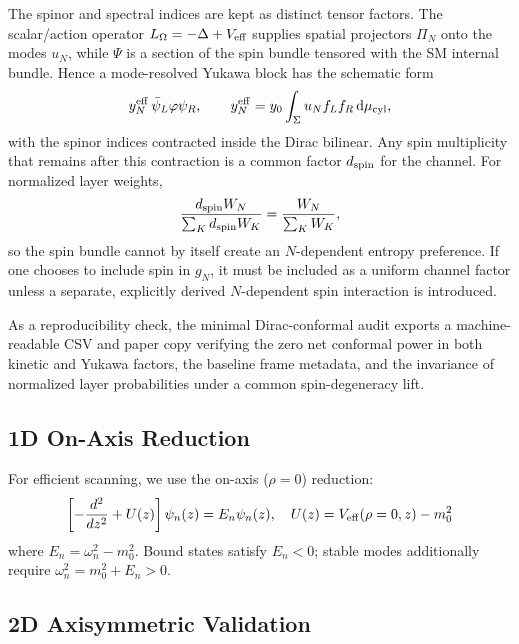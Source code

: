 \documentclass[aps,prd,onecolumn,notitlepage,nofootinbib,superscriptaddress,11pt,floatfix]{revtex4-2}
\newcommand{\dd}{\mathrm{d}}
\begin{document}
The spinor and spectral indices are kept as distinct tensor factors.  The scalar/action operator \(L_\Omega=-\Delta+V_{\rm eff}\) supplies spatial projectors \(\Pi_N\) onto the modes \(u_N\), while \(\Psi\) is a section of the spin bundle tensored with the SM internal bundle.  Hence a mode-resolved Yukawa block has the schematic form
\begin{equation}
y_N^{\rm eff}\,\bar\psi_L\varphi\psi_R,\qquad
y_N^{\rm eff}=y_0\int_\Sigma u_N f_L f_R\,\dd\mu_{\rm cyl},
\end{equation}
with the spinor indices contracted inside the Dirac bilinear.  Any spin multiplicity that remains after this contraction is a common factor \(d_{\rm spin}\) for the channel.  For normalized layer weights,
\begin{equation}
\frac{d_{\rm spin}W_N}{\sum_K d_{\rm spin}W_K}
=
\frac{W_N}{\sum_K W_K},
\end{equation}
so the spin bundle cannot by itself create an \(N\)-dependent entropy preference.  If one chooses to include spin in \(g_N\), it must be included as a uniform channel factor unless a separate, explicitly derived \(N\)-dependent spin interaction is introduced.

As a reproducibility check, the minimal Dirac-conformal audit exports a machine-readable CSV and paper copy verifying the zero net conformal power in both kinetic and Yukawa factors, the baseline frame metadata, and the invariance of normalized layer probabilities under a common spin-degeneracy lift.

\subsection{1D On-Axis Reduction}
\label{app:1D}

For efficient scanning, we use the on-axis ($\rho = 0$) reduction:
\begin{equation}
\left[-\frac{d^2}{dz^2} + U(z)\right]\psi_n(z) = E_n \psi_n(z), \quad U(z) = V_{\rm eff}(\rho=0, z) - m_0^2
\end{equation}
where $E_n = \omega_n^2 - m_0^2$. Bound states satisfy $E_n < 0$; stable modes additionally require $\omega_n^2 = m_0^2 + E_n > 0$.

\subsection{2D Axisymmetric Validation}
\label{app:2D}
\end{document}
